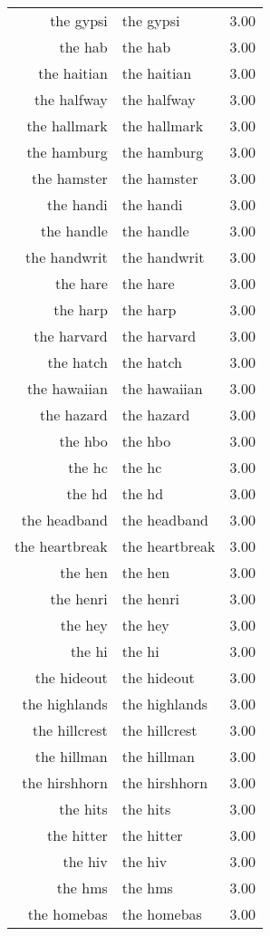 \begin{table}[ht]
\begin{tabular}{rlr}
  the gypsi & the gypsi & 3.00 \\ 
  the hab & the hab & 3.00 \\ 
  the haitian & the haitian & 3.00 \\ 
  the halfway & the halfway & 3.00 \\ 
  the hallmark & the hallmark & 3.00 \\ 
  the hamburg & the hamburg & 3.00 \\ 
  the hamster & the hamster & 3.00 \\ 
  the handi & the handi & 3.00 \\ 
  the handle & the handle & 3.00 \\ 
  the handwrit & the handwrit & 3.00 \\ 
  the hare & the hare & 3.00 \\ 
  the harp & the harp & 3.00 \\ 
  the harvard & the harvard & 3.00 \\ 
  the hatch & the hatch & 3.00 \\ 
  the hawaiian & the hawaiian & 3.00 \\ 
  the hazard & the hazard & 3.00 \\ 
  the hbo & the hbo & 3.00 \\ 
  the hc & the hc & 3.00 \\ 
  the hd & the hd & 3.00 \\ 
  the headband & the headband & 3.00 \\ 
  the heartbreak & the heartbreak & 3.00 \\ 
  the hen & the hen & 3.00 \\ 
  the henri & the henri & 3.00 \\ 
  the hey & the hey & 3.00 \\ 
  the hi & the hi & 3.00 \\ 
  the hideout & the hideout & 3.00 \\ 
  the highlands & the highlands & 3.00 \\ 
  the hillcrest & the hillcrest & 3.00 \\ 
  the hillman & the hillman & 3.00 \\ 
  the hirshhorn & the hirshhorn & 3.00 \\ 
  the hits & the hits & 3.00 \\ 
  the hitter & the hitter & 3.00 \\ 
  the hiv & the hiv & 3.00 \\ 
  the hms & the hms & 3.00 \\ 
  the homebas & the homebas & 3.00 \\ 

\end{tabular}
\end{table}
